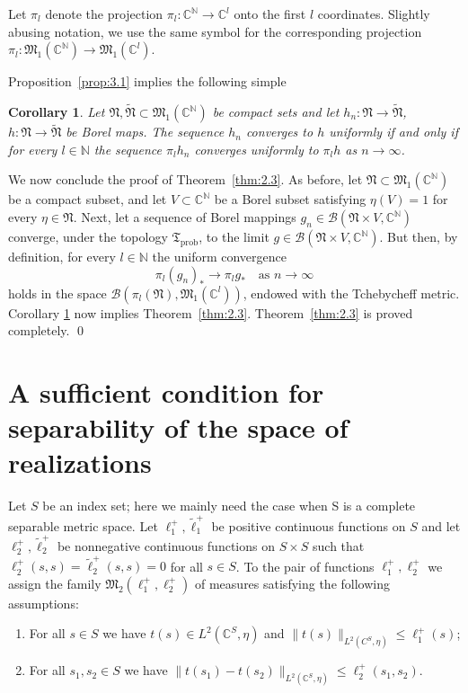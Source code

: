 \documentclass[12pt,a4paper]{article}
\newtheorem{corollary}[theorem]{Corollary}
\theoremstyle{definition}
\theoremstyle{remark}
\newcommand{\BB}{\mathscr{B}}
\newcommand{\MM}{{\mathfrak{M}}}
\newcommand{\NN}{{\mathfrak{N}}}
\newcommand{\TT}{{\mathfrak{T}}}
\begin{document}
	
	Let $\pi_l$ denote the projection $\pi_l \colon \mathbb{C}^{\mathbb{N}} \to \mathbb{C}^l$ onto the first $l$ coordinates.
	Slightly abusing notation, we use the same symbol for the corresponding projection
	$\pi_l \colon \MM_1(\mathbb{C}^{\mathbb{N}}) \to \MM_1(\mathbb{C}^l)$.
	
	Proposition~\ref{prop:3.1} implies the following simple
	
	\begin{corollary}
		\label{cor:3.3}
		Let $\NN, \widetilde{\NN} \subset \MM_1(\mathbb{C}^{\mathbb{N}})$ be compact sets and let $h_n \colon \NN \to \widetilde{\NN}$,
		$h \colon \NN \to \widetilde{\NN}$ be Borel maps. The sequence $h_n$ converges to $h$ uniformly
		if and only if for every $l \in \mathbb{N}$ the sequence $\pi_l h_n$ converges uniformly to $\pi_l h$
		as $n \to \infty$.
	\end{corollary}
	
	We now conclude the proof of Theorem~\ref{thm:2.3}. As before, let $\NN \subset \MM_1(\mathbb{C}^{\mathbb{N}})$
	be a compact subset, and let $V \subset \mathbb{C}^{\mathbb{N}}$ be a Borel subset satisfying $\eta(V) = 1$ for every $\eta \in \NN$.
	Next, let a sequence  of Borel mappings $g_n \in \BB(\NN \times V, \mathbb{C}^{\mathbb{N}})$ converge, under the topology $\TT_{\mathrm{prob}}$, to the limit $g \in \BB(\NN \times V, \mathbb{C}^{\mathbb{N}})$.
	But then, by definition, for every $l \in \mathbb{N}$ the uniform convergence
	\[
	\pi_l(g_n)_* \to \pi_l g_* \quad \text{as } n \to \infty
	\]
	holds in the space $\BB(\pi_l(\NN), \MM_1(\mathbb{C}^l))$, endowed with the Tchebycheff metric. Corollary \ref{cor:3.3} now implies Theorem~\ref{thm:2.3}.
	Theorem~\ref{thm:2.3} is proved completely. \qed
	
	\section{A sufficient condition for separability of the space of realizations}
	\label{sec:4}
	
	Let $S$ be an index set; here we mainly need the case when S is a complete separable metric space. Let $\ell_1^+, \widetilde{\ell}_1^+$ be positive continuous functions on $S$ and let $\ell_2^+, \widetilde{\ell}_2^+$
	be nonnegative continuous  functions on $S \times S$ such that $\ell_2^+(s, s) = \widetilde{\ell}_2^+(s, s) = 0$
	for all $s \in S$. To the pair of functions $\ell_1^+, \ell_2^+$ 
	we assign the family $\MM_2(\ell_1^+, \ell_2^+)$ of measures satisfying the following assumptions:
	\begin{enumerate}
		\item For all $s \in S$ we have $t(s) \in L^2(\mathbb{C}^S, \eta)$ and $\|t(s)\|_{L^2(C^S, \eta)} \le \ell_1^+(s)$;
		\item For all $s_1, s_2 \in S$ we have $\|t(s_1) - t(s_2)\|_{L^2(\mathbb{C}^S, \eta)} \le \ell_2^+(s_1, s_2)$.
	\end{enumerate}
	
\end{document}
